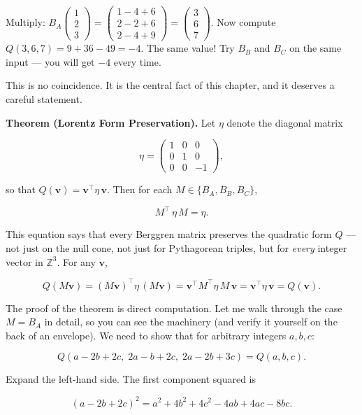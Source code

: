 \documentclass[11pt,openright,twoside]{book}
\theoremstyle{definition}
\begin{document}
Multiply: $B_A \begin{pmatrix} 1 \\ 2 \\ 3 \end{pmatrix} = \begin{pmatrix} 1 - 4 + 6 \\ 2 - 2 + 6 \\ 2 - 4 + 9 \end{pmatrix} = \begin{pmatrix} 3 \\ 6 \\ 7 \end{pmatrix}.$ Now compute $Q(3, 6, 7) = 9 + 36 - 49 = -4.$ The same value! Try $B_B$ and $B_C$ on the same input --- you will get $-4$ every time.

This is no coincidence. It is the central fact of this chapter, and it deserves a careful statement.

\textbf{Theorem (Lorentz Form Preservation).} Let $\eta$ denote the diagonal matrix

\[\eta = \begin{pmatrix} 1 & 0 & 0 \\ 0 & 1 & 0 \\ 0 & 0 & -1 \end{pmatrix},\]

so that $Q(\mathbf{v}) = \mathbf{v}^\top \eta\, \mathbf{v}$. Then for each $M \in \{B_A, B_B, B_C\}$,

\[M^{\!\top}\, \eta\, M = \eta.\]

This equation says that every Berggren matrix preserves the quadratic form $Q$ --- not just on the null cone, not just for Pythagorean triples, but for \textit{every} integer vector in $\mathbb{Z}^3$. For any $\mathbf{v}$,

\[Q(M\mathbf{v}) = (M\mathbf{v})^\top \eta\, (M\mathbf{v}) = \mathbf{v}^\top M^\top \eta\, M\, \mathbf{v} = \mathbf{v}^\top \eta\, \mathbf{v} = Q(\mathbf{v}).\]

The proof of the theorem is direct computation. Let me walk through the case $M = B_A$ in detail, so you can see the machinery (and verify it yourself on the back of an envelope). We need to show that for arbitrary integers $a, b, c$:

\[Q(a - 2b + 2c,\; 2a - b + 2c,\; 2a - 2b + 3c) = Q(a, b, c).\]

Expand the left-hand side. The first component squared is

\[(a - 2b + 2c)^2 = a^2 + 4b^2 + 4c^2 - 4ab + 4ac - 8bc.\]
\end{document}

